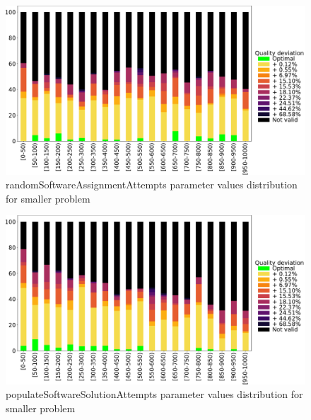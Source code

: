 \begin{figure}
	\centering
	\includegraphics[width=\textwidth]{images/DistrObj/randomSoftwareAssignmentAttempts.pdf}
	\caption[randomSoftwareAssignmentAttempts parameter values distribution for smaller problem]{randomSoftwareAssignmentAttempts parameter values distribution for smaller problem}
	\label{fig:randomSoftwareAssignmentAttempts_Obj}
\end{figure}
\begin{figure}
	\centering
	\includegraphics[width=\textwidth]{images/DistrObj/populateSoftwareSolutionAttempts.pdf}
	\caption[populateSoftwareSolutionAttempts parameter values distribution for smaller problem]{populateSoftwareSolutionAttempts parameter values distribution for smaller problem}
	\label{fig:populateSoftwareSolutionAttempts_Obj}
\end{figure}